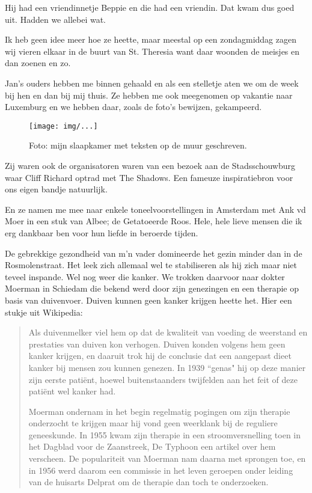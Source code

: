 \documentclass[10pt,twoside,openright]{memoir}
\begin{document}
Hij had een vriendinnetje Beppie en die had een vriendin. Dat kwam dus goed uit. Hadden we allebei wat. 

Ik heb geen idee meer hoe ze heette, maar meestal op een zondagmiddag zagen wij vieren elkaar in de buurt van St. Theresia want daar woonden de meisjes en dan zoenen en zo.

Jan’s ouders hebben me binnen gehaald en als een stelletje aten we om de week bij hen en dan bij mij thuis. Ze hebben me ook meegenomen op vakantie naar Luxemburg en we hebben daar, zoals de foto’s bewijzen, gekampeerd. 

\begin{figure}[t]
\texttt{[image: img/...]}
\caption{Foto: mijn slaapkamer met teksten op de muur geschreven.}
\end{figure}

Zij waren ook de organisatoren waren van een bezoek aan de Stadsschouwburg waar Cliff Richard optrad met The Shadows. Een fameuze inspiratiebron voor ons eigen bandje natuurlijk. 

En ze namen me mee naar enkele toneelvoorstellingen in Amsterdam met Ank vd Moer in een stuk van Albee; de Getatoeerde Roos. Hele, hele lieve mensen die ik erg dankbaar ben voor hun liefde in beroerde tijden. 

De gebrekkige gezondheid van m’n vader domineerde het gezin minder dan in de Rosmolenstraat. Het leek zich allemaal wel te stabiliseren als hij zich maar niet teveel inspande. Wel nog weer die kanker. We trokken daarvoor naar dokter Moerman in Schiedam die bekend werd door zijn genezingen en een therapie op basis van duivenvoer. Duiven kunnen geen kanker krijgen heette het. Hier een stukje uit Wikipedia:

\begin{quote}
Als duivenmelker viel hem op dat de kwaliteit van voeding de weerstand en prestaties van duiven kon verhogen. Duiven konden volgens hem geen kanker krijgen, en daaruit trok hij de conclusie dat een aangepast dieet kanker bij mensen zou kunnen genezen. In 1939 ``genas" hij op deze manier zijn eerste patiënt, hoewel buitenstaanders twijfelden aan het feit of deze patiënt wel kanker had. 

Moerman ondernam in het begin regelmatig pogingen om zijn therapie onderzocht te krijgen maar hij vond geen weerklank bij de reguliere geneeskunde. In 1955 kwam zijn therapie in een stroomversnelling toen in het Dagblad voor de Zaanstreek, De Typhoon een artikel over hem verscheen. De populariteit van Moerman nam daarna met sprongen toe, en in 1956 werd daarom een commissie in het leven geroepen onder leiding van de huisarts Delprat om de therapie dan toch te onderzoeken.
\end{quote}
\end{document}
